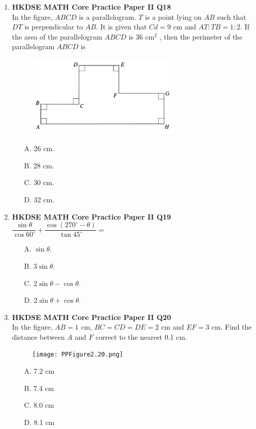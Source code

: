 \documentclass[12pt]{article}
\begin{document}
\begin{enumerate}
	\item \textbf{HKDSE MATH Core Practice Paper II Q18}\\
	In the figure, $ABCD$ is a parallelogram. $T$ is a point lying on $AB$ such that $DT$ is perpendicular to $AB$. It is given that $Cd = 9$ cm and $AT : TB = 1 : 2$. If the area of the parallelogram $ABCD$ is 36 cm$^2$ , then the perimeter of the parallelogram $ABCD$ is
	\begin{figure}[H]
		\centering
		\includegraphics[width = 0.7\textwidth]{PPFigure2.18.png}	
	\end{figure}
	\begin{enumerate}
		\item[A.] 26 cm.
		\item[B.] 28 cm.
		\item[C.] 30 cm.
		\item[D.] 32 cm.
	\end{enumerate}

	\item \textbf{HKDSE MATH Core Practice Paper II Q19}\\
	$\dfrac{\sin{\theta}}{\cos{60^\circ}} + \dfrac{\cos{(270^\circ - \theta)}}{\tan{45^\circ}} = $ 
	\begin{enumerate}
		\item[A.] $\sin{\theta}$.
		\item[B.] $3\sin{\theta}$.
		\item[C.] $2\sin{\theta} - \cos{\theta}$.
		\item[D.] $2\sin{\theta} + \cos{\theta}$.
	\end{enumerate}

	\item \textbf{HKDSE MATH Core Practice Paper II Q20}\\
	In the figure, $AB = 1$ cm, $BC = CD = DE = 2$ cm and $EF = 3$ cm. Find the distance between $A$ and $F$ correct to the nearest 0.1 cm.
	\begin{figure}[H]
		\centering
		\texttt{[image: PPFigure2.20.png]}	
	\end{figure}
	\begin{enumerate}
		\item[A.] 7.2 cm
		\item[B.] 7.4 cm
		\item[C.] 8.0 cm
		\item[D.] 8.1 cm
	\end{enumerate}


\end{enumerate}
\end{document}

